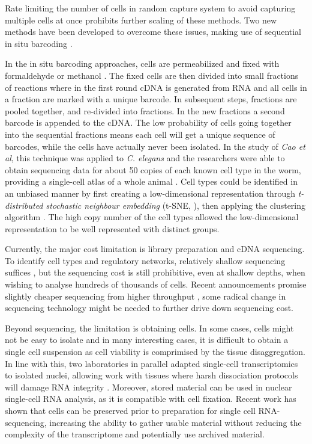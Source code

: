Rate limiting the number of cells in random capture system to avoid capturing multiple cells at once prohibits further scaling of these methods. Two new methods have been developed to overcome these issues, making use of sequential in situ barcoding \cite{Rosenberg2017-jt, Cao2017-ux}.

In the in situ barcoding approaches, cells are permeabilized and fixed with formaldehyde \cite{Rosenberg2017-jt} or methanol \cite{Cao2017-ux}. The fixed cells are then divided into small fractions of reactions where in the first round cDNA is generated from RNA and all cells in a fraction are marked with a unique barcode. In subsequent steps, fractions are pooled together, and re-divided into fractions. In the new fractions a second barcode is appended to the cDNA. The low probability of cells going together into the sequential fractions means each cell will get a unique sequence of barcodes, while the cells have actually never been isolated. In the study of \textit{Cao et al}, this technique was applied to \textit{C. elegans} and the researchers were able to obtain sequencing data for about 50 copies of each known cell type in the worm, providing a single-cell atlas of a whole animal \cite{Cao2017-ux}. Cell types could be identified in an unbiased manner by first creating a low-dimensional representation through \textit{t-distributed stochastic neighbour embedding} (t-SNE, \citet{Van_der_Maaten2008-lh}), then applying the  clustering algorithm \cite{Rodriguez2014-mc}. The high copy number of the cell types allowed the low-dimensional representation to be well represented with distinct groups.

Currently, the major cost limitation is library preparation and cDNA sequencing. To identify cell types and regulatory networks, relatively shallow sequencing suffices \cite{Heimberg2016-qw, Pollen2014-cs}, but the sequencing cost is still prohibitive, even at shallow depths, when wishing to analyse hundreds of thousands of cells. Recent announcements promise slightly cheaper sequencing from higher throughput \cite{Illumina_Inc2017-zg}, some radical change in sequencing technology might be needed to further drive down sequencing cost.

Beyond sequencing, the limitation is obtaining cells. In some cases, cells might not be easy to isolate and in many interesting cases, it is difficult to obtain a single cell suspension as cell viability is comprimised by the tissue disaggregation. In line with this, two laboratories in parallel adapted single-cell transcriptomics to isolated nuclei, allowing work with tissues where harsh dissociation protocols will damage RNA integrity \cite{Habib2016-jm, Habib2017-jk, Lake2016-zb}. Moreover, stored material can be used in nuclear single-cell RNA analysis, as it is compatible with cell fixation. Recent work has shown that cells can be preserved prior to preparation for single cell RNA-sequencing, increasing the ability to gather usable material without reducing the complexity of the transcriptome \cite{Guillaumet-Adkins2017-po, Alles2017-vi} and potentially use archived material.

